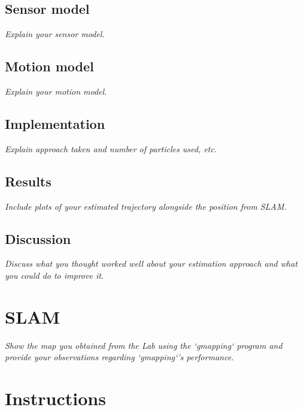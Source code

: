 \documentclass[a4paper,12pt]{article}
\newcommand{\comment}[1]{\emph{\color{blue}#1}}
\begin{document}
\subsection{Sensor model}

\comment{Explain your sensor model.}


\subsection{Motion model}

\comment{Explain your motion model.}


\subsection{Implementation}

\comment{Explain approach taken and number of particles used, etc.}


\subsection{Results}

\comment{Include plots of your estimated trajectory alongside the
  position from SLAM.}


\subsection{Discussion}

\comment{Discuss what you thought worked well about your estimation
  approach and what you could do to improve it.}


\section{SLAM}

\comment{Show the map you obtained from the Lab using the `gmapping`
  program and provide your observations regarding `gmapping`'s
  performance.}




\color{blue}
\section*{Instructions}
\end{document}
